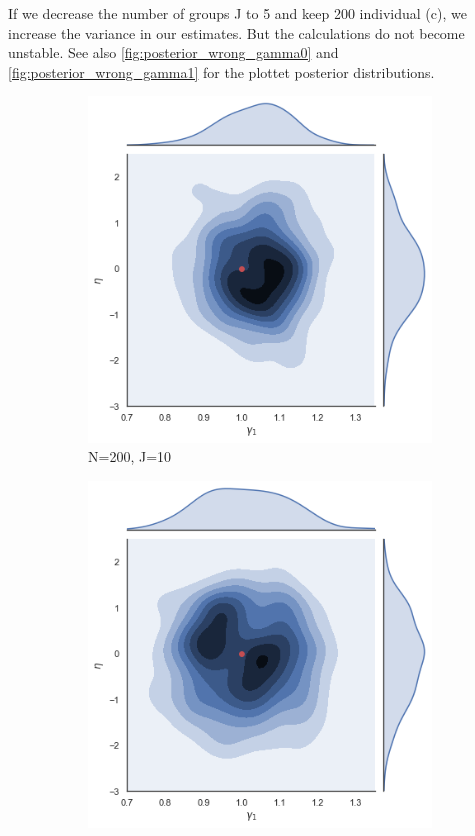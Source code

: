 If we decrease the number of groups J to 5 and keep 200 individual (c), we increase the variance in our estimates. But the calculations do not become unstable.
See also \ref{fig:posterior_wrong_gamma0} and \ref{fig:posterior_wrong_gamma1} for the plottet posterior distributions.

\begin{figure}[H]
  \centering
  \begin{subfigure}[b]{0.3\linewidth}
    \includegraphics[width=\linewidth]{graphics/jointplot_gamma1eta_big}
    \caption{ N=200, J=10}
  \end{subfigure}
  \begin{subfigure}[b]{0.3\linewidth}
    \includegraphics[width=\linewidth]{graphics/jointplot_gamma1eta_small}

\end{subfigure}
\end{figure}
